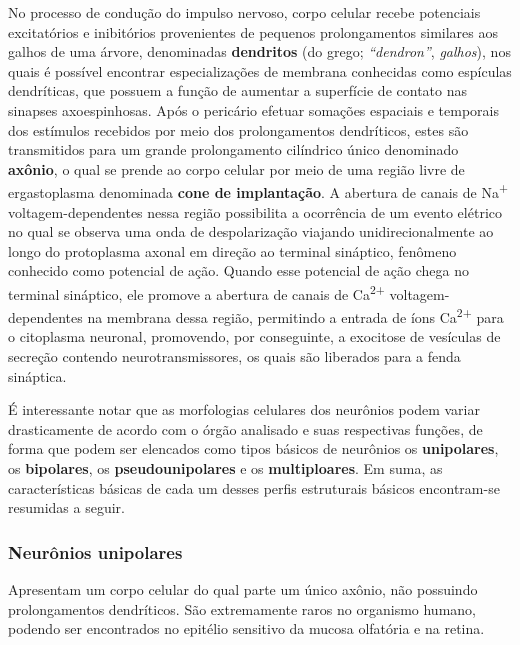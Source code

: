 \documentclass[
]{book}
\begin{document}
No processo de condução do impulso nervoso, corpo celular recebe potenciais excitatórios e inibitórios provenientes de pequenos prolongamentos similares aos galhos de uma árvore, denominadas \textbf{dendritos} (do grego; \emph{``dendron''}, \emph{galhos}), nos quais é possível encontrar especializações de membrana conhecidas como espículas dendríticas, que possuem a função de aumentar a superfície de contato nas sinapses axoespinhosas. Após o pericário efetuar somações espaciais e temporais dos estímulos recebidos por meio dos prolongamentos dendríticos, estes são transmitidos para um grande prolongamento cilíndrico único denominado \textbf{axônio}, o qual se prende ao corpo celular por meio de uma região livre de ergastoplasma denominada \textbf{cone de implantação}. A abertura de canais de Na\textsuperscript{+} voltagem-dependentes nessa região possibilita a ocorrência de um evento elétrico no qual se observa uma onda de despolarização viajando unidirecionalmente ao longo do protoplasma axonal em direção ao terminal sináptico, fenômeno conhecido como potencial de ação. Quando esse potencial de ação chega no terminal sináptico, ele promove a abertura de canais de Ca\textsuperscript{2+} voltagem-dependentes na membrana dessa região, permitindo a entrada de íons Ca\textsuperscript{2+} para o citoplasma neuronal, promovendo, por conseguinte, a exocitose de vesículas de secreção contendo neurotransmissores, os quais são liberados para a fenda sináptica.

É interessante notar que as morfologias celulares dos neurônios podem variar drasticamente de acordo com o órgão analisado e suas respectivas funções, de forma que podem ser elencados como tipos básicos de neurônios os \textbf{unipolares}, os \textbf{bipolares}, os \textbf{pseudounipolares} e os \textbf{multiploares}. Em suma, as características básicas de cada um desses perfis estruturais básicos encontram-se resumidas a seguir.

\hypertarget{neuruxf4nios-unipolares}{%
\subsubsection*{Neurônios unipolares}\label{neuruxf4nios-unipolares}}

Apresentam um corpo celular do qual parte um único axônio, não possuindo prolongamentos dendríticos. São extremamente raros no organismo humano, podendo ser encontrados no epitélio sensitivo da mucosa olfatória e na retina.
\end{document}
